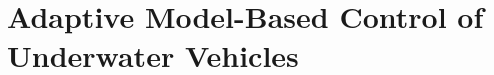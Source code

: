 \chapter{Adaptive Model-Based Control of Underwater Vehicles}
\label{chUV_AMBC}
\acresetall








